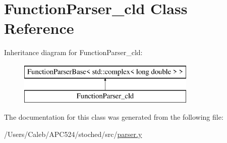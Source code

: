 \hypertarget{class_function_parser__cld}{}\section{Function\+Parser\+\_\+cld Class Reference}
\label{class_function_parser__cld}
Inheritance diagram for Function\+Parser\+\_\+cld\+:\begin{figure}[H]
\begin{center}
\leavevmode
\includegraphics[height=2.000000cm]{class_function_parser__cld}
\end{center}
\end{figure}


The documentation for this class was generated from the following file\+:\begin{DoxyCompactItemize}
\item 
/\+Users/\+Caleb/\+A\+P\+C524/stoched/src/\hyperlink{parser_8y}{parser.\+y}\end{DoxyCompactItemize}
